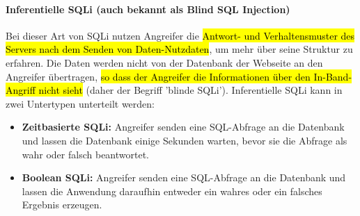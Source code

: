 \paragraph{Inferentielle SQLi (auch bekannt als Blind SQL Injection)} Bei dieser Art von SQLi nutzen Angreifer die \hl{Antwort- und Verhaltensmuster des Servers nach dem Senden von Daten-Nutzdaten}, um mehr über seine Struktur zu erfahren. Die Daten werden nicht von der Datenbank der Webseite an den Angreifer übertragen, \hl{so dass der Angreifer die Informationen über den In-Band-Angriff nicht sieht} (daher der Begriff 'blinde SQLi'). Inferentielle SQLi kann in zwei Untertypen unterteilt werden:

\begin{itemize}
	\item \textbf{Zeitbasierte SQLi:} Angreifer senden eine SQL-Abfrage an die Datenbank und lassen die Datenbank einige Sekunden warten, bevor sie die Abfrage als wahr oder falsch beantwortet.
	\item \textbf{Boolean SQLi:} Angreifer senden eine SQL-Abfrage an die Datenbank und lassen die Anwendung daraufhin entweder ein wahres oder ein falsches Ergebnis erzeugen.
\end{itemize}


